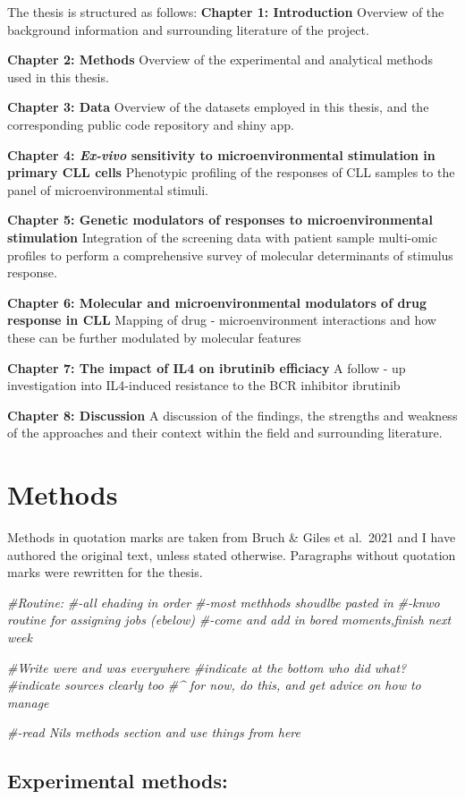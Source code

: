 \documentclass[11pt, a4paper, twosided]{book}
\newenvironment{Shaded}{\begin{snugshade}}{\end{snugshade}}
\newcommand{\CommentTok}[1]{\textcolor[rgb]{0.56,0.35,0.01}{\textit{#1}}}
\begin{document}
The thesis is structured as follows:
\textbf{Chapter 1: Introduction} Overview of the background information and surrounding literature of the project.

\textbf{Chapter 2: Methods} Overview of the experimental and analytical methods used in this thesis.

\textbf{Chapter 3: Data} Overview of the datasets employed in this thesis, and the corresponding public code repository and shiny app.

\textbf{Chapter 4: \emph{Ex-vivo} sensitivity to microenvironmental stimulation in primary CLL cells }
Phenotypic profiling of the responses of CLL samples to the panel of microenvironmental stimuli.

\textbf{Chapter 5: Genetic modulators of responses to microenvironmental stimulation} Integration of the screening data with patient sample multi-omic profiles to perform a comprehensive survey of molecular determinants of stimulus response.

\textbf{Chapter 6: Molecular and microenvironmental modulators of drug response in CLL} Mapping of drug - microenvironment interactions and how these can be further modulated by molecular features

\textbf{Chapter 7: The impact of IL4 on ibrutinib efficiacy } A follow - up investigation into IL4-induced resistance to the BCR inhibitor ibrutinib

\textbf{Chapter 8: Discussion } A discussion of the findings, the strengths and weakness of the approaches and their context within the field and surrounding literature.

\hypertarget{methods}{%
\chapter{Methods}\label{methods}}

Methods in quotation marks are taken from Bruch \& Giles et al.~2021 and I have authored the original text, unless stated otherwise. Paragraphs without quotation marks were rewritten for the thesis.
\begin{Shaded}
\begin{Highlighting}[]
\CommentTok{\#Routine: }
\CommentTok{\#{-}all ehading in order}
\CommentTok{\#{-}most methhods shoudlbe pasted in}
\CommentTok{\#{-}knwo routine for assigning jobs (ebelow)}
\CommentTok{\#{-}come and add in bored moments,finish next week }

\CommentTok{\#Write were and was everywhere }
\CommentTok{\#indicate at the bottom who did what? }
\CommentTok{\#indicate sources clearly too}
\CommentTok{\#\^{} for now, do this, and get advice on how to manage}

\CommentTok{\#{-}read Nils methods section and use things from here }
\end{Highlighting}
\end{Shaded}
\hypertarget{experimental-methods}{%
\section{Experimental methods:}\label{experimental-methods}}
\end{document}
